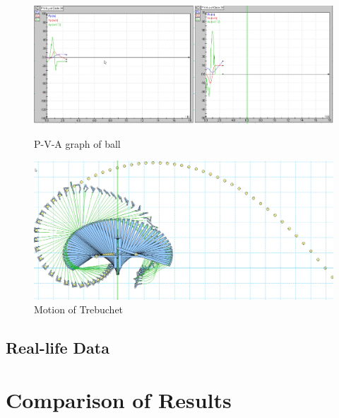 \documentclass[12pt, titlepage]{article}
\begin{document}
\begin{figure}[b]
    \begin{minipage}[t]{0.69\textwidth}
        \vspace{12pt}
        \begin{flushleft}
            \includegraphics[width=\textwidth]{figures/Graphs.png}
        \end{flushleft}
        \caption{P-V-A graph of ball\label{graphs}}
    \end{minipage}
    \hfill
    \begin{minipage}[t]{0.3\textwidth}
        \vspace{50pt}
        \begin{flushright}
            \includegraphics[width=\textwidth]{figures/Motion.png}
        \end{flushright}
        \caption{Motion of Trebuchet\label{motion}}
    \end{minipage}
    \end{figure}
    \newpage
    \subsection{Real-life Data}

    \newpage
    \section{Comparison of Results}
    \newpage
\end{document}
